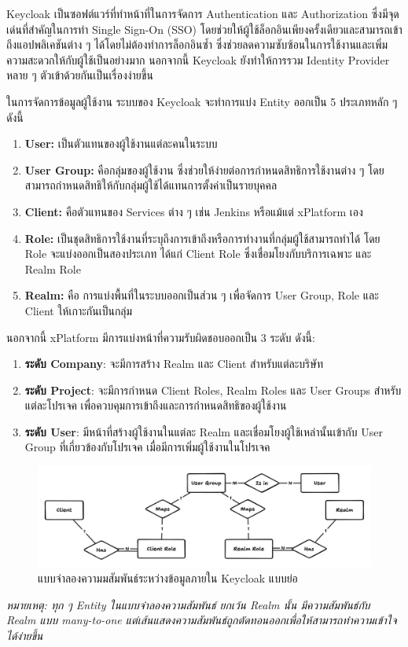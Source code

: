 Keycloak เป็นซอฟต์แวร์ที่ทำหน้าที่ในการจัดการ Authentication และ Authorization ซึ่งมีจุดเด่นที่สำคัญในการทำ Single Sign-On (SSO) โดยช่วยให้ผู้ใช้ล็อกอินเพียงครั้งเดียวและสามารถเข้าถึงแอปพลิเคชันต่าง ๆ ได้โดยไม่ต้องทำการล็อกอินซ้ำ ซึ่งช่วยลดความซับซ้อนในการใช้งานและเพิ่มความสะดวกให้กับผู้ใช้เป็นอย่างมาก นอกจากนี้ Keycloak ยังทำให้การรวม Identity Provider หลาย ๆ ตัวเข้าด้วยกันเป็นเรื่องง่ายขึ้น

ในการจัดการข้อมูลผู้ใช้งาน ระบบของ Keycloak จะทำการแบ่ง Entity ออกเป็น 5 ประเภทหลัก ๆ ดังนี้
\begin{enumerate}
    \item \textbf{User:} เป็นตัวแทนของผู้ใช้งานแต่ละคนในระบบ
    \item \textbf{User Group:} คือกลุ่มของผู้ใช้งาน ซึ่งช่วยให้ง่ายต่อการกำหนดสิทธิการใช้งานต่าง ๆ โดยสามารถกำหนดสิทธิให้กับกลุ่มผู้ใช้ได้แทนการตั้งค่าเป็นรายบุคคล
    \item \textbf{Client:} คือตัวแทนของ Services ต่าง ๆ เช่น Jenkins หรือแม้แต่ xPlatform เอง
    \item \textbf{Role:} เป็นชุดสิทธิการใช้งานที่ระบุถึงการเข้าถึงหรือการทำงานที่กลุ่มผู้ใช้สามารถทำได้ โดย Role จะแบ่งออกเป็นสองประเภท ได้แก่ Client Role ซึ่งเชื่อมโยงกับบริการเฉพาะ และ Realm Role
    \item \textbf{Realm:} คือ การแบ่งพื้นที่ในระบบออกเป็นส่วน ๆ เพื่อจัดการ User Group, Role และ Client ให้เกาะกันเป็นกลุ่ม
\end{enumerate}
นอกจากนี้ xPlatform มีการแบ่งหน้าที่ความรับผิดชอบออกเป็น 3 ระดับ ดังนี้:

\begin{enumerate}
    \item \textbf{ระดับ Company}: จะมีการสร้าง Realm และ Client สำหรับแต่ละบริษัท 
    \item \textbf{ระดับ Project}: จะมีการกำหนด Client Roles, Realm Roles และ User Groups สำหรับแต่ละโปรเจค เพื่อควบคุมการเข้าถึงและการกำหนดสิทธิของผู้ใช้งาน
    \item \textbf{ระดับ User}: มีหน้าที่สร้างผู้ใช้งานในแต่ละ Realm และเชื่อมโยงผู้ใช้เหล่านั้นเข้ากับ User Group ที่เกี่ยวข้องกับโปรเจค เมื่อมีการเพิ่มผู้ใช้งานในโปรเจค
\end{enumerate}
\begin{figure}[H]
    \begin{center}
        \includegraphics[scale=0.29]{resources/keycloak-er.png}
    \end{center}
    \caption[แบบจำลองความมสัมพันธ์ระหว่างข้อมูลภายใน Keycloak แบบย่อ]{แบบจำลองความมสัมพันธ์ระหว่างข้อมูลภายใน Keycloak แบบย่อ}
    \label{fig:keycloak-er}
\end{figure}
\textit{หมายเหตุ: ทุก ๆ Entity ในแบบจำลองความสัมพันธ์ ยกเว้น Realm นั้น มีความสัมพันธ์กับ Realm แบบ many-to-one แต่เส้นแสดงความสัมพันธ์ถูกตัดทอนออกเพื่อให้สามารถทำความเข้าใจได้ง่ายขึ้น}

